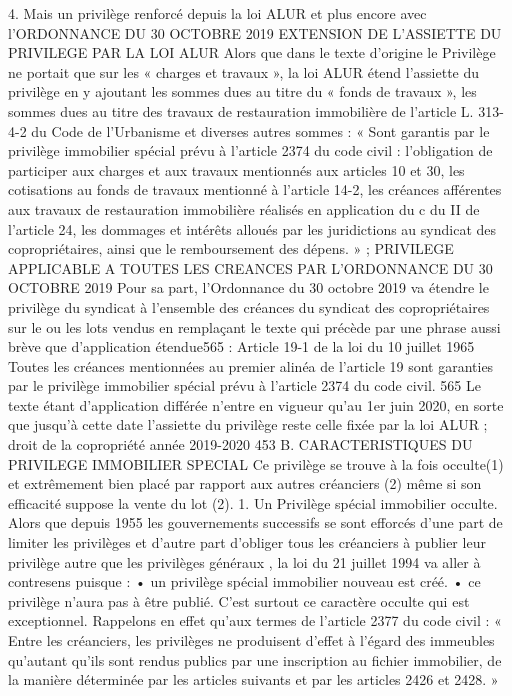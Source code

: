 4. Mais un privilège renforcé depuis la loi ALUR et plus encore avec l’ORDONNANCE DU 30 OCTOBRE 2019
EXTENSION DE L’ASSIETTE DU PRIVILEGE PAR LA LOI ALUR
Alors que dans le texte d’origine le Privilège ne portait que sur les « charges et travaux », la loi ALUR étend l’assiette du privilège en y ajoutant les sommes dues au titre du « fonds de travaux », les sommes dues au titre des travaux de restauration immobilière de l’article L. 313-4-2 du Code de l'Urbanisme et diverses autres sommes :
« Sont garantis par le privilège immobilier spécial prévu à l’article 2374 du code civil : l’obligation de participer aux charges et aux travaux mentionnés aux articles 10 et 30, les cotisations au fonds de travaux mentionné à l’article 14-2, les créances afférentes aux travaux de restauration immobilière réalisés en application du c du II de l’article 24, les dommages et intérêts alloués par les juridictions au syndicat des copropriétaires, ainsi que le remboursement des dépens. » ;
PRIVILEGE APPLICABLE A TOUTES LES CREANCES PAR L’ORDONNANCE DU 30 OCTOBRE 2019
Pour sa part, l’Ordonnance du 30 octobre 2019 va étendre le privilège du syndicat à l’ensemble des créances du syndicat des copropriétaires sur le ou les lots vendus en remplaçant le texte qui précède par une phrase aussi brève que d’application étendue565 :
Article 19-1 de la loi du 10 juillet 1965
Toutes les créances mentionnées au premier alinéa de l'article 19 sont garanties par le privilège immobilier spécial prévu à l'article 2374 du code civil.
565 Le texte étant d’application différée n’entre en vigueur qu’au 1er juin 2020, en sorte que jusqu’à cette date l’assiette du privilège reste celle fixée par la loi ALUR ;
droit de la copropriété année 2019-2020
453
B. CARACTERISTIQUES DU PRIVILEGE IMMOBILIER SPECIAL
Ce privilège se trouve à la fois occulte(1) et extrêmement bien placé par rapport aux autres créanciers (2) même si son efficacité suppose la vente du lot (2).
1. Un Privilège spécial immobilier occulte.
Alors que depuis 1955 les gouvernements successifs se sont efforcés d’une part de limiter les privilèges et d’autre part d’obliger tous les créanciers à publier leur privilège autre que les privilèges généraux , la loi du 21 juillet 1994 va aller à contresens puisque :
• un privilège spécial immobilier nouveau est créé.
• ce privilège n'aura pas à être publié.
C’est surtout ce caractère occulte qui est exceptionnel.
Rappelons en effet qu’aux termes de l’article 2377 du code civil : « Entre les créanciers, les privilèges ne produisent d'effet à l'égard des immeubles qu'autant qu'ils sont rendus publics par une inscription au fichier immobilier, de la manière déterminée par les articles suivants et par les articles 2426 et 2428. »
